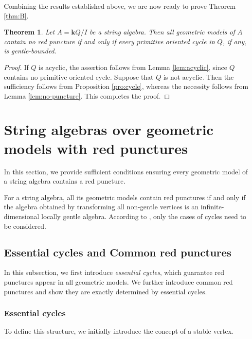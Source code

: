 \documentclass[11pt]{amsart}
\numberwithin{equation}{section}
\newtheorem{theorem}{Theorem}[section]
\theoremstyle{definition}
\begin{document}
 


Combining the results established above, we are now ready to prove Theorem \ref{thm:B}.

\begin{theorem}\label{thm:no-puncture}
Let \(A=\mathbf{k}Q/I\) be a string algebra. Then all geometric models of \(A\) contain no red puncture if and only if every primitive oriented cycle in \(Q\), if any, is
gentle-bounded.
\end{theorem}
\begin{proof}
If \(Q\) is acyclic, the assertion follows from Lemma \ref{lem:acyclic}, since \(Q\) contains no primitive oriented cycle. Suppose that \(Q\) is not acyclic. Then the sufficiency follows from Proposition \ref{pro:cycle}, whereas the necessity follows from Lemma \ref{lem:no-puncture}. This completes the proof.
\end{proof}


\section{String algebras over geometric models with red punctures}\label{section:String algebras over geometric models with red punctures}
In this section, we provide sufficient conditions ensuring every geometric model of a string algebra contains a red puncture.
 
For a string algebra, all its geometric models contain red punctures if and only if the algebra obtained by transforming all non-gentle vertices is an infinite-dimensional locally gentle algebra. According to \cite{PPP19}, only the cases of cycles need to be considered.

\subsection{Essential cycles and Common red punctures}

In this subsection, we first introduce \emph{essential cycles}, which guarantee red punctures appear in all geometric models. We further introduce common red punctures and show they are exactly determined by essential cycles.

\subsubsection{Essential cycles}
To define this structure, we  initially introduce the concept of a stable vertex.
\end{document}
